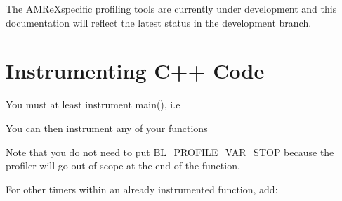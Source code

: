 \documentclass[letterpaper,10pt,english]{sphinxmanual}
\begin{document}
\sphinxAtStartPar
The AMReX\sphinxhyphen{}specific profiling tools are currently under development and this
documentation will reflect the latest status in the development branch.


\section{Instrumenting C++ Code}
\label{\detokenize{AMReX_Profiling_Tools:instrumenting-c-code}}
\sphinxAtStartPar
You must at least instrument main(), i.e

\begin{sphinxVerbatim}[commandchars=\\\{\}]
 


\end{sphinxVerbatim}

\sphinxAtStartPar
You can then instrument any of your functions

\begin{sphinxVerbatim}[commandchars=\\\{\}]
 
    

\end{sphinxVerbatim}

\sphinxAtStartPar
Note that you do not need to put BL\_PROFILE\_VAR\_STOP because the profiler will
go out of scope at the end of the function.

\sphinxAtStartPar
For other timers within an already instrumented function, add:

\begin{sphinxVerbatim}[commandchars=\\\{\}]
   
   
   
\end{sphinxVerbatim}
\end{document}
